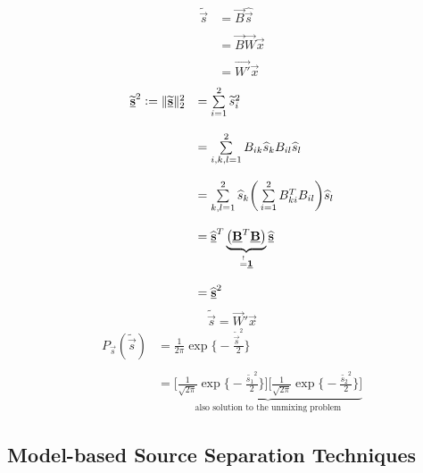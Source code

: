 \begin{enumerate}[(1)]
\begin{equation}
	\begin{array}{ll}
		\widetilde{\vec{s}} 
		& = \vec{B} \widehat{\vec{s}} \\\\
		& = \vec{B} \vec{W} \vec{x} \\\\
		& = \vec{W'} \vec{x}
	\end{array}
\end{equation}
\begin{equation}
	\begin{array}{ll}
		\widetilde{\underline{\mathbf{s}}}^2:=\|\widetilde{\underline{\mathbf{s}}}\|_2^2 
		& = \sum\limits_{i = 1}^2 \widetilde{s}_i^2 \\\\
		& = \sum\limits_{i,k,l = 1}^2 B_{ik} \widehat{s}_k B_{il} \widehat{s}_l
			\\\\
		& = \sum\limits_{k,l = 1}^2 \widehat{s}_k
			\bigg( \sum\limits_{i = 1}^2 B_{ki}^T B_{il} \bigg)
			\widehat{s}_l \\\\
		& = \widehat{\underline{\mathbf{s}}}^T 
			\underbrace{ \big( \underline{\mathbf{B}}^T \underline{\mathbf{B}} \big) }_{
				\stackrel{\mathrm{!}}{=} \underline{\mathbf{1}} } \widehat{\underline{\mathbf{s}}} \\\\
		& = \widehat{\underline{\mathbf{s}}}^2
	\end{array}
\end{equation}
\begin{equation}
	\widetilde{\vec{s}} = \vec{W}' \vec{x}
\end{equation}
\begin{equation}
	\begin{array}{ll}
	P_{\vec{s}}(\widetilde{\vec{s}}) 
	& = \frac{1}{2\pi} \exp \bigg\{ -\frac{\widetilde{\vec{s}}^2}{2} \bigg\}
	\\\\
	& = \underbrace{ \Bigg[ \frac{1}{\sqrt{2\pi}} \exp \bigg\{ -
		\frac{\widetilde{s_1}^2}{2} \bigg\} \Bigg] \Bigg[
			\frac{1}{\sqrt{2\pi}} \exp \bigg\{ -
			\frac{\widetilde{s_2}^2}{2} \bigg\}
		\Bigg] }_{\text{also solution to the unmixing problem} }
	\end{array}
\end{equation}
\end{enumerate}

\subsection[Model-based Source Separation]{Model-based Source Separation Techniques}
